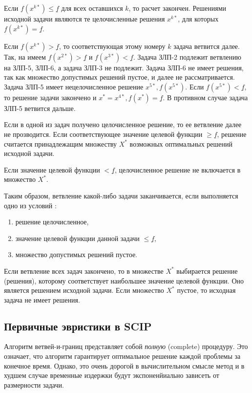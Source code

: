 \documentclass[%
	11pt,
	a4paper,
	utf8,
		]{article}
\begin{document}
Если $ f(x^{k*}) \leqslant \underline{f} $ для всех оставшихся $ k $, то расчет закончен. Решениями исходной задачи являются те целочисленные решения $ x^{k*} $, для которых $ f(x^{k*}) = \underline{f} $.

Если $ f(x^{k*}) > \underline{f} $, то соответствующая этому номеру $ k $ задача ветвится далее. Так, на  имеем $ f(x^{2*}) > \underline{f} $ и $ f(x^{3*}) < \underline{f} $. Задача ЗЛП-2 подлежит ветвлению на ЗЛП-5, ЗЛП-6, а задача ЗЛП-3 не подлежит. Задача ЗЛП-6 не имеет решения, так как множество допустимых решений пустое, и далее не рассматривается. Задача ЗЛП-5 имеет нецелочисленное решение $ x^{5*}, f(x^{5*}) $. Если $ f(x^{5*}) < \underline{f} $, то решение задачи закончено и $ x^* = x^{4*}, f(x^*) = \underline{f} $. В противном случае задача ЗЛП-5 ветвится дальше.

Если в одной из задач получено целочисленное решение, то ее ветвление далее не прозводится. Если соответствующее значение целевой функции $ \geqslant \underline{f} $, решение считается принадлежащим множеству $ X^* $ возможных оптимальных решений исходной задачи.

Если значение целевой функции $ < \underline{f} $, целочисленное решение не включается в множество $ X^* $.

Таким образом, ветвление какой-либо задачи заканчивается, если выполняется одно из условий \cite{panteleev}:
\begin{enumerate}
	\item решение целочисленное,
	
	\item значение целевой функции данной задачи $ \leqslant \underline{f} $,
	
	\item множество допустимых решений пустое.
\end{enumerate}

Если ветвление всех задач закончено, то в множестве $ X^* $ выбирается решение (решения), которому соответствует наибольшее значение целевой функции. Оно является решением исходной задачи. Если множество $ X^* $ пустое, то исходная задача не имеет решения.

\subsection{Первичные эвристики в SCIP}

Алгоритм ветвей-и-границ представляет собой \emph{полную} (complete) процедуру. Это означает, что алгоритм гарантирует оптимальное решение каждой проблемы за конечное время. Однако, это очень дорогой в вычислительном смысле метод и в худшем случае временные издержки будут экспоненйиально зависеть от размерности задачи.
\end{document}
